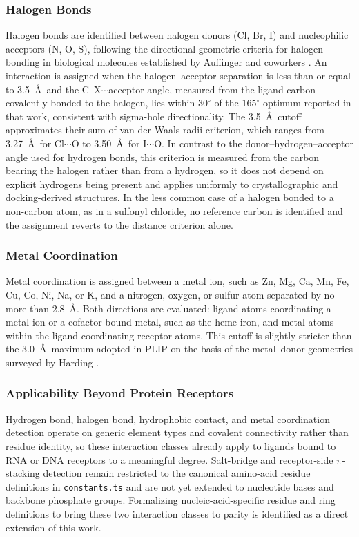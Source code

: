 \documentclass[journal=jacsat,manuscript=article]{achemso}
\begin{document}
\subsubsection{Halogen Bonds}
Halogen bonds are identified between halogen donors (Cl, Br, I) and nucleophilic acceptors (N, O, S), following the directional geometric criteria for halogen bonding in biological molecules established by Auffinger and coworkers \cite{auffinger2004halogen}. An interaction is assigned when the halogen–acceptor separation is less than or equal to 3.5~\AA\ and the C–X$\cdots$acceptor angle, measured from the ligand carbon covalently bonded to the halogen, lies within $30^{\circ}$ of the $165^{\circ}$ optimum reported in that work, consistent with sigma-hole directionality. The 3.5~\AA\ cutoff approximates their sum-of-van-der-Waals-radii criterion, which ranges from 3.27~\AA\ for Cl$\cdots$O to 3.50~\AA\ for I$\cdots$O. In contrast to the donor–hydrogen–acceptor angle used for hydrogen bonds, this criterion is measured from the carbon bearing the halogen rather than from a hydrogen, so it does not depend on explicit hydrogens being present and applies uniformly to crystallographic and docking-derived structures. In the less common case of a halogen bonded to a non-carbon atom, as in a sulfonyl chloride, no reference carbon is identified and the assignment reverts to the distance criterion alone.

\subsubsection{Metal Coordination}
Metal coordination is assigned between a metal ion, such as Zn, Mg, Ca, Mn, Fe, Cu, Co, Ni, Na, or K, and a nitrogen, oxygen, or sulfur atom separated by no more than 2.8~\AA. Both directions are evaluated: ligand atoms coordinating a metal ion or a cofactor-bound metal, such as the heme iron, and metal atoms within the ligand coordinating receptor atoms. This cutoff is slightly stricter than the 3.0~\AA\ maximum adopted in PLIP \cite{salentin2015plip} on the basis of the metal--donor geometries surveyed by Harding \cite{harding2001geometry}.

\subsubsection{Applicability Beyond Protein Receptors}
Hydrogen bond, halogen bond, hydrophobic contact, and metal coordination detection operate on generic element types and covalent connectivity rather than residue identity, so these interaction classes already apply to ligands bound to RNA or DNA receptors to a meaningful degree. Salt-bridge and receptor-side $\pi$-stacking detection remain restricted to the canonical amino-acid residue definitions in \texttt{constants.ts} and are not yet extended to nucleotide bases and backbone phosphate groups. Formalizing nucleic-acid-specific residue and ring definitions to bring these two interaction classes to parity is identified as a direct extension of this work.
\end{document}
